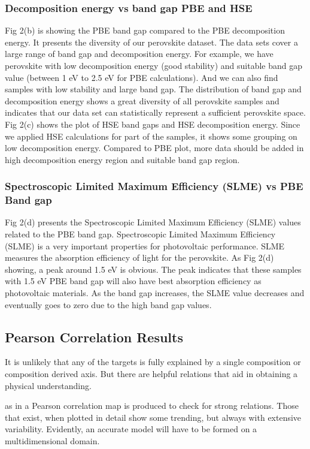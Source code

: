 \documentclass[twoside,twocolumn,9pt]{article}
\begin{document}
%
\subsubsection*{Decomposition energy vs band gap PBE and HSE}
Fig 2(b) is showing the PBE band gap compared to the PBE decomposition
energy. It presents the diversity of our perovskite dataset. The data
sets cover a large range of band gap and decomposition energy. For
example, we have perovskite with low decomposition energy (good
stability) and suitable band gap value (between 1 eV to 2.5 eV for PBE
calculations). And we can also find samples with low stability and
large band gap. The distribution of band gap and decomposition energy
shows a great diversity of all perovskite samples and indicates that
our data set can statistically represent a sufficient perovskite
space.  Fig 2(c) shows the plot of HSE band gaps and HSE decomposition
energy. Since we applied HSE calculations for part of the samples, it
shows some grouping on low decomposition energy. Compared to PBE plot,
more data should be added in high decomposition energy region and
suitable band gap region.
\subsubsection*{Spectroscopic Limited Maximum Efficiency (SLME) vs PBE Band gap}
Fig 2(d) presents the Spectroscopic Limited Maximum Efficiency (SLME)
values related to the PBE band gap. Spectroscopic Limited Maximum
Efficiency (SLME) is a very important properties for photovoltaic
performance. SLME measures the absorption efficiency of light for the
perovskite. As Fig 2(d) showing, a peak around 1.5 eV is obvious. The
peak indicates that these samples with 1.5 eV PBE band gap will also
have best absorption efficiency as photovoltaic materials. As the band
gap increases, the SLME value decreases and eventually goes to zero
due to the high band gap values.

\subsection*{Pearson Correlation Results}
It is unlikely that any of the targets is fully explained by a single
composition or composition derived axis. But there are helpful
relations that aid in obtaining a physical understanding.

as in a Pearson correlation map is produced to check for strong
relations. Those that exist, when plotted in detail show some
trending, but always with extensive variability. Evidently, an
accurate model will have to be formed on a multidimensional
domain.
\end{document}
